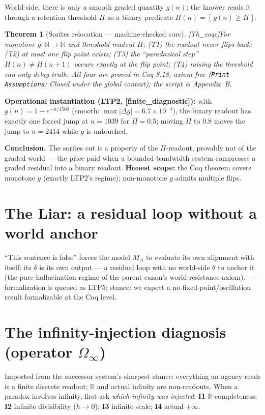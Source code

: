 \documentclass[11pt,a4paper,twoside]{book}
\newcommand{\tier}[1]{\textnormal{\small\textsf{[#1]}}}
\newcommand{\coq}{\tier{Th\_coqc}}\newcommand{\fd}{\tier{finite\_diagnostic}}
\theoremstyle{plain}
\newtheorem{theorem}{Theorem}[chapter]
\theoremstyle{definition}
\theoremstyle{remark}
\begin{document}
World-side, there is only a smooth graded quantity $g(n)$; the knower reads it
through a retention threshold $\Pi$ as a binary predicate
$H(n) = [\,g(n)\ge\Pi\,]$.

\begin{theorem}[Sorites relocation --- machine-checked core]\coq\label{th:sorites}
For monotone $g:\mathbb{N}\to\mathbb{N}$ and threshold readout $H$:
\emph{(T1)} the readout never flips back; \emph{(T2)} at most one flip point
exists; \emph{(T3)} the ``paradoxical step'' $H(n)\neq H(n{+}1)$ occurs
exactly at the flip point; \emph{(T4)} raising the threshold can only delay
truth. All four are proved in Coq 8.18, axiom-free
(\texttt{Print Assumptions}: \emph{Closed under the global context});
the script is Appendix~B.
\end{theorem}

\noindent\textbf{Operational instantiation (LTP2, \fd):} with
$g(n)=1-e^{-n/1500}$ (smooth: $\max|\Delta g| = 6.7\times10^{-4}$), the
binary readout has exactly one forced jump at $n=1039$ for $\Pi=0.5$; moving
$\Pi$ to $0.8$ moves the jump to $n=2414$ while $g$ is untouched.

\textbf{Conclusion.} The sorites cut is a property of the $\Pi$-readout,
provably not of the graded world --- the price paid when a bounded-bandwidth
system compresses a graded residual into a binary readout. \textbf{Honest
scope:} the Coq theorem covers monotone $g$ (exactly LTP2's regime);
non-monotone $g$ admits multiple flips.

\section{The Liar: a residual loop without a world anchor}

``This sentence is false'' forces the model $M_A$ to evaluate its own
alignment with itself: its $\delta$ is its own output --- a residual loop
with no world-side $\theta$ to anchor it (the pure-hallucination regime of
the parent canon's world-resistance axiom). \Wf\ --- formalization is queued
as LTP5; stance: we expect a no-fixed-point/oscillation result formalizable
at the Coq level.

\section{The infinity-injection diagnosis (operator $\Omega_\infty$)}

Imported from the successor system's sharpest stance: everything an agency
reads is a finite discrete readout; $\mathbb{R}$ and actual infinity are
non-readouts. When a paradox involves infinity, first ask \emph{which
infinity was injected}: \textbf{I1} $\mathbb{R}$-completeness; \textbf{I2}
infinite divisibility ($h\to0$); \textbf{I3} infinite scale; \textbf{I4}
actual $+\infty$.
\end{document}
